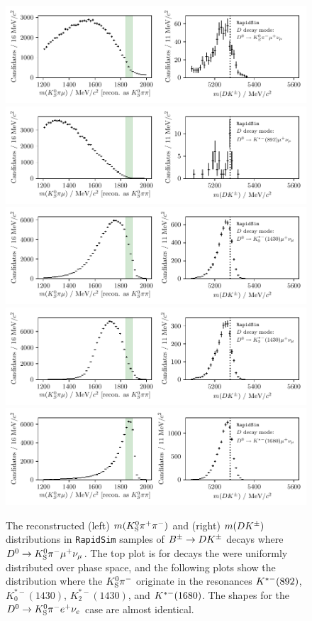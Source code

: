 \begin{figure}[tbp]
    \centering
    \includegraphics[width=0.8\columnwidth]{figures/analysis/background_checks/semilep_D_mu_PHSP.pdf}
    \includegraphics[width=0.8\columnwidth]{figures/analysis/background_checks/semilep_D_mu_892.pdf}
    \includegraphics[width=0.8\columnwidth]{figures/analysis/background_checks/semilep_D_mu_1430.pdf}
    \includegraphics[width=0.8\columnwidth]{figures/analysis/background_checks/semilep_D_mu_1430_2.pdf}
    \includegraphics[width=0.8\columnwidth]{figures/analysis/background_checks/semilep_D_mu_1680.pdf}
    \caption{The reconstructed (left) $m({{K}^0_{\mathrm{S}}} \pi^+ \pi^-)$ and (right) $m(D{{K}^\pm})$ distributions in \texttt{RapidSim} samples of ${{B}^\pm}\rightarrow{\ensuremath{D}} {\ensuremath{{K}^\pm}}$ decays where ${{D}^0}\rightarrow{\ensuremath{{K}^0_{\mathrm{S}}}}\pi^-\mu^+\nu_\mu$. The top plot is for  decays the were uniformly distributed over phase space, and the following plots show the distribution where the ${{K}^0_{\mathrm{S}}}{{\pi}^-}$ originate in the resonances ${{K}^{*-}}(892)$, $K^{*-}_0(1430)$, $K^{*-}_2(1430)$, and ${{K}^{*-}}(1680)$. The shapes for the ${{D}^0}\rightarrow{\ensuremath{{K}^0_{\mathrm{S}}}}\pi^-e^+\nu_e$ case are almost identical.}
    \label{fig:semileptonic_D_decays_kspp}
\end{figure}



